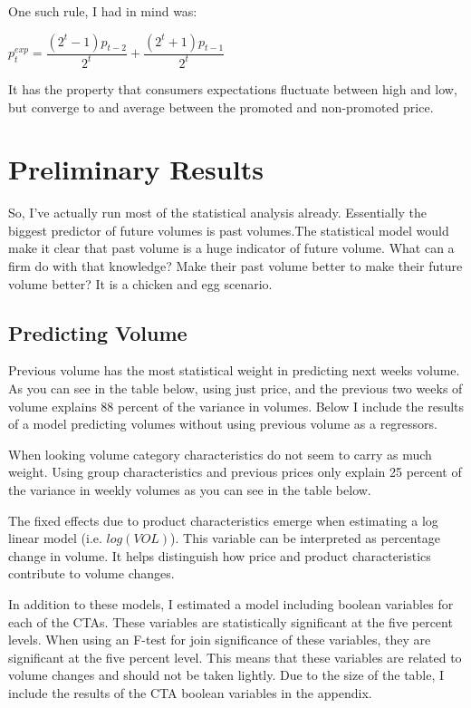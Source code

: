 \documentclass{article}
\begin{document}
One such rule, I had in mind was:

$p^{exp}_t = \dfrac {(2^t-1)p_{t-2}} {2^t} + \dfrac {(2^t+1)p_{t-1}} {2^t}$ 

It has the property that consumers expectations fluctuate between high and low, but converge to and average between the promoted and non-promoted price.


\section{Preliminary Results}

So, I've actually run most of the statistical analysis already. Essentially the biggest predictor of future volumes is past volumes.The statistical model would make it clear that past volume is a huge indicator of future volume. What can a firm do with that knowledge? Make their past volume better to make their future volume better? It is a chicken and egg scenario.

\subsection{Predicting Volume}

Previous volume has the most statistical weight in predicting next weeks volume. As you can see in the table below, using just price, and the previous two weeks of volume explains 88 percent of the variance in volumes. Below I include the results of a model predicting volumes without using previous volume as a regressors.


When looking volume category characteristics do not seem to carry as much weight. Using group characteristics and previous prices only explain 25 percent of the variance in weekly volumes as you can see in the table below.

The fixed effects due to product characteristics emerge when estimating a log linear model (i.e. $log(VOL)$).  This variable can be interpreted as percentage change in volume. It helps distinguish how price and product characteristics contribute to volume changes. 


In addition to these models, I estimated a model including boolean variables for each of the CTAs. These variables are statistically significant at the five percent levels. When using an F-test for join significance of these variables, they are significant at the five percent level. This means that these variables are related to volume changes and should not be taken lightly. Due to the size of the table, I include the results of the CTA boolean variables in the appendix.
\end{document}
